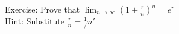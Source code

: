 \documentclass[preview]{standalone}
\begin{document}
\begin{center}
Exercise: Prove that $\lim_{n \to \infty} (1 + \frac rn)^n = e^r$ \\ Hint: Substitute $\frac rn = \frac 1/n'$
\end{center}
\end{document}
